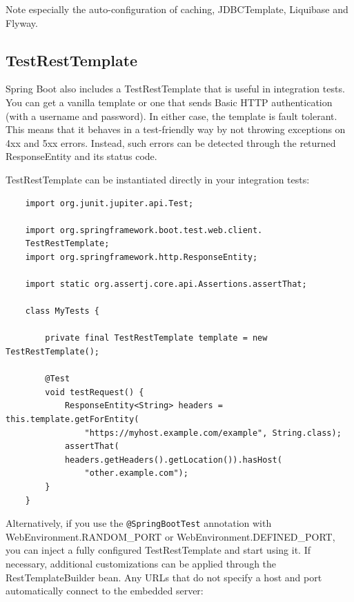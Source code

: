 \documentclass{scrartcl}
\begin{document}
Note especially the auto-configuration of caching, JDBCTemplate, Liquibase and Flyway.

\subsection{TestRestTemplate}

Spring Boot also includes a TestRestTemplate that is useful in integration tests. You can get a vanilla template or one that sends Basic HTTP authentication (with a username and password). In either case, the template is fault tolerant. This means that it behaves in a test-friendly way by not throwing exceptions on 4xx and 5xx errors. Instead, such errors can be detected through the returned ResponseEntity and its status code.

TestRestTemplate can be instantiated directly in your integration tests:

\begin{lstlisting}
    import org.junit.jupiter.api.Test;

    import org.springframework.boot.test.web.client.
    TestRestTemplate;
    import org.springframework.http.ResponseEntity;

    import static org.assertj.core.api.Assertions.assertThat;

    class MyTests {

        private final TestRestTemplate template = new TestRestTemplate();

        @Test
        void testRequest() {
            ResponseEntity<String> headers = this.template.getForEntity(
                "https://myhost.example.com/example", String.class);
            assertThat(
            headers.getHeaders().getLocation()).hasHost(
                "other.example.com");
        }
    }
\end{lstlisting}

Alternatively, if you use the \lstinline|@SpringBootTest| annotation with WebEnvironment.RANDOM\_PORT or WebEnvironment.DEFINED\_PORT, you can inject a fully configured TestRestTemplate and start using it. If necessary, additional customizations can be applied through the RestTemplateBuilder bean. Any URLs that do not specify a host and port automatically connect to the embedded server:
\end{document}
